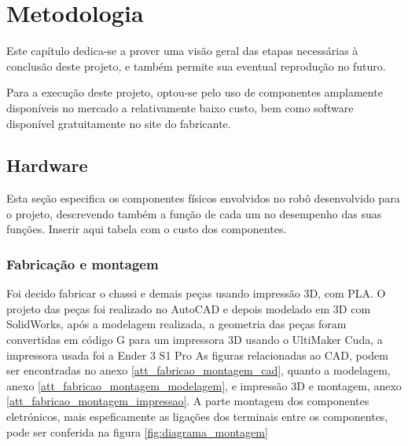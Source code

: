 
\chapter{Metodologia}

{\color{red}Este capítulo dedica-se a prover uma visão geral das etapas necessárias à conclusão deste projeto, e também
permite sua eventual reprodução no futuro.}

Para a execução deste projeto, optou-se pelo uso de componentes amplamente disponíveis no mercado a relativamente baixo
custo, bem como software disponível gratuitamente no site do fabricante.


\section{Hardware}
{\color{red} Esta seção especifica os componentes físicos envolvidos no robô desenvolvido para o projeto, descrevendo
também a função de cada um no desempenho das suas funções.}
{\color{red} Inserir aqui tabela com o custo dos componentes.}

\subsection{Fabricação e montagem}
Foi decido fabricar o chassi e demais peças usando impressão 3D, com PLA.
O projeto das peças foi realizado no AutoCAD e depois modelado em 3D com SolidWorks, após a modelagem realizada,
a geometria das peças foram convertidas em código G para um impressora 3D usando o UltiMaker Cuda, a impressora usada foi a Ender 3 S1 Pro
As figuras relacionadas ao CAD, podem ser encontradas no anexo \ref{att_fabricao_montagem_cad}, quanto a modelagem,
anexo \ref{att_fabricao_montagem_modelagem}, e impressão 3D e montagem, anexo \ref{att_fabricao_montagem_impressao}.
A parte montagem dos componentes eletrónicos, mais espeficamente as ligações dos terminais entre os componentes,
pode ser conferida na figura \ref{fig:diagrama_montagem}

